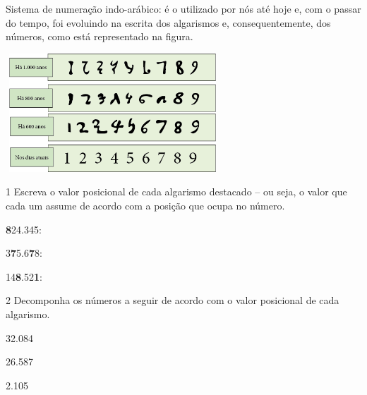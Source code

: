 {Sistema de numeração indo-arábico: é o utilizado por nós
até hoje e, com o passar do tempo, foi evoluindo na escrita dos algarismos e, consequentemente, dos números, como está representado na figura.

\includegraphics[width=3.15027in,height=1.75015in]{media/image5.png}
}


\num{1} Escreva o valor posicional de cada algarismo
destacado -- ou seja, o valor que cada um assume de acordo com a posição
que ocupa no número.

\begin{escolha}
\item \textbf{8}24.345: 

\item 3\textbf{7}5.6\textbf{7}8: 

\item 14\textbf{8}.52\textbf{1}:
\end{escolha}

\num{2} Decomponha os números a seguir de acordo com o valor posicional de cada
algarismo.

\begin{escolha}
\item 32.084


\item
  26.587

  
\item
  2.105

\end{escolha}



